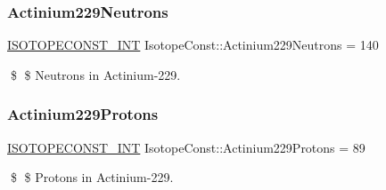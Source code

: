 \subsubsection{\texorpdfstring{Actinium229\+Neutrons}{Actinium229Neutrons}}
{\footnotesize\ttfamily \mbox{\hyperlink{group___isotope_const-_macros_ga5f18360b3e99483a35c32d789e62621c}{I\+S\+O\+T\+O\+P\+E\+C\+O\+N\+S\+T\+\_\+\+I\+NT}} Isotope\+Const\+::\+Actinium229\+Neutrons = 140}

\$ \$ Neutrons in Actinium-\/229. \mbox{\label{group___isotope_const-_actinium-_ac229_gadc85c7052583aad372739b15636de2ab}} 
\subsubsection{\texorpdfstring{Actinium229\+Protons}{Actinium229Protons}}
{\footnotesize\ttfamily \mbox{\hyperlink{group___isotope_const-_macros_ga5f18360b3e99483a35c32d789e62621c}{I\+S\+O\+T\+O\+P\+E\+C\+O\+N\+S\+T\+\_\+\+I\+NT}} Isotope\+Const\+::\+Actinium229\+Protons = 89}

\$ \$ Protons in Actinium-\/229. 